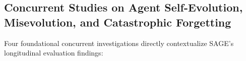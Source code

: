 
\subsection{Concurrent Studies on Agent Self-Evolution, Misevolution, and Catastrophic Forgetting}
\label{sec:concurrent_studies}

Four foundational concurrent investigations directly contextualize SAGE's longitudinal evaluation findings:

